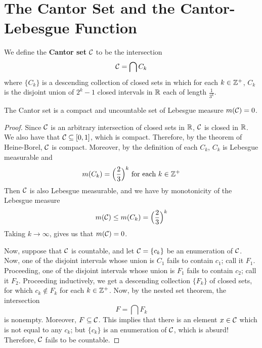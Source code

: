 \section{The Cantor Set and the Cantor-Lebesgue Function}

\begin{definition}
    We define the \textbf{Cantor set} $\mathcal{C}$ to be the intersection
    \begin{equation*}
        \mathcal{C}=\bigcap{C_k}
    \end{equation*}
    where $\{C_k\}$ is a descending collection of closed sets in which for each
    $k \in \mathbb{Z}^+$,  $C_k$ is the disjoint union of  $2^k-1$ closed intervals in
    $\mathbb{R}$ each of length $\frac{1}{3^k}$.
\end{definition}

\begin{theorem}\label{theorem_1.5.1}
    The Cantor set is a compact and uncountable set of Lebesgue measure
    $m(\mathcal{C})=0$.
\end{theorem}
\begin{proof}
    Since $\mathcal{C}$ is an arbitrary intersection of closed sets in  $\mathbb{R}$,  $\mathcal{C}$ is
    closed in  $\mathbb{R}$. We also have that $\mathcal{C} \subseteq [0,1]$, which is compact.
    Therefore, by the theorem of Heine-Borel, $\mathcal{C}$ is compact. Moreover, by
    the definition of each  $C_k$,  $C_k$ is Lebesgue measurable and
    \begin{equation*}
        m(C_k)=\Big{(} \frac{2}{3} \Big{)}^k \text{ for each } k \in \mathbb{Z}^+
    \end{equation*}
    Then $\mathcal{C}$ is also Lebesgue measurable, and we have by monotonicity of the
    Lebesgue measure
    \begin{equation*}
        m(\mathcal{C}) \leq m(C_k)=\Big{(} \frac{2}{3} \Big{)}^k
    \end{equation*}
    Taking $k \xrightarrow{} \infty$, gives us that $m(\mathcal{C})=0$.

    Now, suppose that $\mathcal{C}$ is countable, and let $\mathcal{C}=\{c_k\}$ be an
    enumeration of $\mathcal{C}$. Now, one of the disjoint intervals whose union is
    $C_1$ fails to contain $c_1$; call it $F_1$. Proceeding, one of the disjoint
    intervals whose union is $F_1$ fails to contain $c_2$; call it $F_2$.
    Proceeding inductively, we get a descending collection $\{F_k\}$ of closed
    sets, for which $c_k \notin F_k$ for each  $k \in \mathbb{Z}^+$. Now, by the nested
    set theorem, the intersection
    \begin{equation*}
        F=\bigcap{F_k}
    \end{equation*}
    is nonempty. Moreover, $F \subseteq \mathcal{C}$. This implies that there is an
    element $x \in \mathcal{C}$ which is not equal to any $c_k$; but $\{c_k\}$ is an
    enumeration of $\mathcal{C}$, which is absurd! Therefore, $\mathcal{C}$ fails to be
    countable.
\end{proof}

